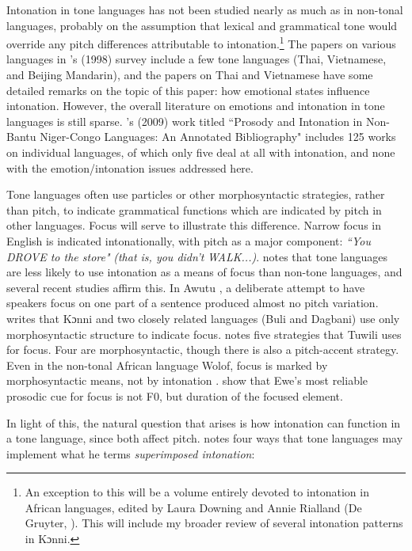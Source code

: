 \documentclass[output=paper]{langsci/langscibook}
\begin{document}
Intonation in tone languages has not been studied nearly as much as in non-tonal languages, probably on the assumption that lexical and grammatical tone would override any pitch differences attributable to intonation.\footnote{An exception to this will be a volume entirely devoted to intonation in African languages, edited by Laura Downing and Annie Rialland (De Gruyter, \citeyear{downingriallandforth}). This will include my broader review of several intonation patterns in Kɔnni.} The papers on various languages in \citeauthor{hirstdicristo1998}'s (1998) survey include a few tone languages (Thai, Vietnamese, and Beijing Mandarin), and the papers on Thai and Vietnamese have some detailed remarks on the topic of this paper: how emotional states influence intonation. However, the overall literature on emotions and intonation in tone languages is still sparse. \citeauthor{green2009}'s (2009) work titled ``Prosody and Intonation in Non-Bantu Niger-Congo Languages: An Annotated Bibliography" includes 125 works on individual languages, of which only five deal at all with intonation, and none with the emotion/intonation issues addressed here. 

Tone languages often use particles or other morphosyntactic strategies, rather than pitch, to indicate grammatical functions which are indicated by pitch in other languages. Focus will serve to illustrate this difference. Narrow focus in English is indicated intonationally, with pitch as a major component:  \emph{``You DROVE to the store" }\emph{\textup{(that is, you didn't}}\emph{ WALK...}\emph{\textup{)}}. \citet[73]{cruttenden1997} notes that tone languages are less likely to use intonation as a means of focus than non-tone languages, and several recent studies affirm this. In Awutu \citep{Lomotey2014}, a deliberate attempt to have speakers focus on one part of a sentence produced almost no pitch variation. \citet{schwarz2009} writes that Kɔnni and two closely related languages (Buli and Dagbani) use only morphosyntactic structure to indicate focus. \citet{harley2009} notes five strategies that Tuwili uses for focus. Four are morphosyntactic, though there is also a pitch-accent strategy. Even in the non-tonal African language Wolof, focus is marked by morphosyntactic means, not by intonation \citep{riallandrobert2001}. \citet{fiedlerjannedy2013} show that Ewe's most reliable prosodic cue for focus is not F0, but duration of the focused element.

In light of this, the natural question that arises is how intonation can function in a tone language, since both affect pitch. \citet[9--10]{cruttenden1997} notes four ways that tone languages may implement what he terms \emph{superimposed intonation}:
\end{document}
